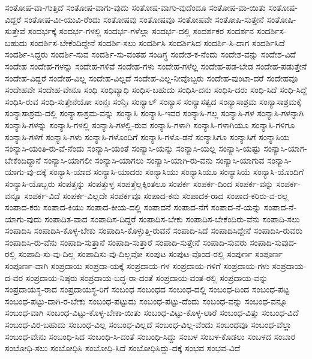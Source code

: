 {ಸಂತೋಷ-ವಾ-ಗುತ್ತಿದೆ
ಸಂತೋಷ-ವಾಗು-ವುದು
ಸಂತೋಷ-ವಾಗು-ವುದೆಂದೂ
ಸಂತೋಷ-ವಾ-ಯಿತು
ಸಂತೋಷ-ವಿದ್ದರೆ
ಸಂತೋಷ-ವೀ-ಯುವಿ-ರೆಂದು
ಸಂತೋಷವು
ಸಂತೋಷವೂ
ಸಂತೋಷವೇ
ಸಂತೋಷಿ-ಸುತ್ತೇನೆ
ಸಂತೋಷಿ-ಸುತ್ತೇವೆ
ಸಂದರ್ಭಕ್ಕೆ
ಸಂದರ್ಭ-ಗಳಲ್ಲಿ
ಸಂದರ್ಭ-ಗಳೆಲ್ಲಾ
ಸಂದರ್ಭ-ದಲ್ಲಿ
ಸಂದರ್ಶಕರ
ಸಂದರ್ಶನ
ಸಂದರ್ಶಿಸ-ಬಹುದು
ಸಂದರ್ಶಿಸ-ಬೇಕೆಂದಿದ್ದೇನೆ
ಸಂದರ್ಶಿ-ಸಲು
ಸಂದರ್ಶಿಸಿ
ಸಂದರ್ಶಿಸಿದ
ಸಂದರ್ಶಿ-ಸಿ-ದಾಗ
ಸಂದರ್ಶಿಸಿದೆ
ಸಂದರ್ಶಿ-ಸಿದ್ದರು
ಸಂದರ್ಶಿ-ಸುವ
ಸಂದರ್ಶಿ-ಸು-ವಂತಹ
ಸಂದಿಗ್ಧ
ಸಂದೇಶ-ಕ-ನೆಂದು
ಸಂದೇಶ-ವನ್ನು
ಸಂದೇಶ-ವಿದೆ
ಸಂದೇಹ
ಸಂದೇಹ-ಗಳನ್ನು
ಸಂದೇಹ-ಗಳಿವೆ
ಸಂದೇಹ-ಗಳು
ಸಂದೇಹ-ಗಳೆಲ್ಲ
ಸಂದೇಹ-ಪಡ-ಬೇಡ
ಸಂದೇಹ-ಪಡುತ್ತೇನೆ
ಸಂದೇಹ-ವಿದ್ದರೆ
ಸಂದೇಹ-ವಿಲ್ಲ
ಸಂದೇಹ-ವಿಲ್ಲದೆ
ಸಂದೇಹ-ವಿಲ್ಲ-ನೀವೊಬ್ಬರು
ಸಂದೇಹ-ವುಂಟಾ-ದರೆ
ಸಂದೇಹವೂ
ಸಂದೇಹವೇ
ಸಂದೇಹ-ವೇನೂ
ಸಂಧಿ
ಸಂಧಿವ್ಯಾಧಿ
ಸಂಧಿಸ-ಬಹುದು
ಸಂಧಿಸಿ-ದನು
ಸಂಧಿಸಿ-ದರು
ಸಂಧಿ-ಸಿದೆ
ಸಂಧಿ-ಸಿದ್ದೆ
ಸಂಧಿಸಿ-ರುವ
ಸಂಧಿ-ಸುತ್ತೇನೆಯೋ
ಸಂನ್ತಃ
ಸಂನ್ತಿಃ
ಸಂನ್ಯಾಲ್
ಸಂನ್ಯಾಸ
ಸಂನ್ಯಾಸತ್ವದ
ಸಂನ್ಯಾಸಾಶ್ರಮ
ಸಂನ್ಯಾಸಾಶ್ರಮಕ್ಕೆ
ಸಂನ್ಯಾಸಾಶ್ರಮ-ದಲ್ಲಿ
ಸಂನ್ಯಾಸಾಶ್ರಮ-ವನ್ನು
ಸಂನ್ಯಾಸಿ
ಸಂನ್ಯಾಸಿ-ಇವರ
ಸಂನ್ಯಾಸಿ-ಗಲ್ಲ
ಸಂನ್ಯಾಸಿ-ಗಳ
ಸಂನ್ಯಾಸಿ-ಗಳನ್ನಾಗಿ
ಸಂನ್ಯಾಸಿ-ಗಳನ್ನು
ಸಂನ್ಯಾಸಿ-ಗಳಲ್ಲಿ
ಸಂನ್ಯಾಸಿ-ಗಳಲ್ಲಿ-ರುವ
ಸಂನ್ಯಾಸಿ-ಗಳಾಗಿ
ಸಂನ್ಯಾಸಿ-ಗಳಾಗಿಯೂ
ಸಂನ್ಯಾಸಿ-ಗಳಿಗೂ
ಸಂನ್ಯಾಸಿ-ಗಳಿಗೆ
ಸಂನ್ಯಾಸಿ-ಗಳು
ಸಂನ್ಯಾಸಿ-ಗಳೊಂದಿಗೆ
ಸಂನ್ಯಾಸಿ-ಗಳೊ-ಡನೆ
ಸಂನ್ಯಾಸಿಗೂ
ಸಂನ್ಯಾಸಿಗೆ
ಸಂನ್ಯಾಸಿಯ
ಸಂನ್ಯಾಸಿ-ಯಂತಿ-ರು-ವೆ-ನೆಂದು
ಸಂನ್ಯಾಸಿ-ಯಂತೆ
ಸಂನ್ಯಾಸಿ-ಯನ್ನು
ಸಂನ್ಯಾಸಿ-ಯಲ್ಲ
ಸಂನ್ಯಾಸಿ-ಯಷ್ಟು
ಸಂನ್ಯಾಸಿ-ಯಾಗ-ಬೇಕೆಂದಿದ್ದಾನೆ
ಸಂನ್ಯಾಸಿ-ಯಾಗಲೀ
ಸಂನ್ಯಾಸಿ-ಯಾಗಲು
ಸಂನ್ಯಾಸಿ-ಯಾಗಿ-ರು-ವನು
ಸಂನ್ಯಾಸಿ-ಯಾಗುವ
ಸಂನ್ಯಾಸಿ-ಯಾಗು-ವು-ದಕ್ಕೆ
ಸಂನ್ಯಾಸಿ-ಯಾದ
ಸಂನ್ಯಾಸಿ-ಯಾದರು
ಸಂನ್ಯಾಸಿಯು
ಸಂನ್ಯಾಸಿಯೂ
ಸಂನ್ಯಾಸಿಯೆ
ಸಂನ್ಯಾಸಿ-ಯೊಂದಿಗೆ
ಸಂನ್ಯಾಸಿ-ಯೊಬ್ಬರು
ಸಂಪತ್ತನ್ನು
ಸಂಪತ್ತುಳ್ಳ
ಸಂಪತ್ತೆಲ್ಲಕ್ಕಿಂತಲೂ
ಸಂಪರ್ಕ
ಸಂಪರ್ಕ-ದಿಂದ
ಸಂಪರ್ಕ-ವನ್ನು
ಸಂಪರ್ಕ-ವನ್ನೂ
ಸಂಪರ್ಕ-ವಿದೆ
ಸಂಪರ್ಕ-ವಿಲ್ಲದೇ
ಸಂಪರ್ಕವೂ
ಸಂಪಾದ-ಕನು
ಸಂಪಾದಕ-ರಾದ
ಸಂಪಾದ-ಕರಿರು-ವ-ರಲ್ಲ
ಸಂಪಾದ-ಕರು
ಸಂಪಾದ-ಕಿಯು
ಸಂಪಾದ-ಕೀಯ-ದಲ್ಲಿ
ಸಂಪಾದನೆ
ಸಂಪಾದ-ನೆಗೆ
ಸಂಪಾದ-ನೆ-ಯನ್ನು
ಸಂಪಾದ-ನೆ-ಯಾಗು-ವುದು
ಸಂಪಾದಿತ-ವಾದ
ಸಂಪಾದಿಸ-ದಿದ್ದರೆ
ಸಂಪಾದಿಸ-ಬೇಕು
ಸಂಪಾದಿಸ-ಬೇಕೆಂದಿರು-ವೆನು
ಸಂಪಾದಿ-ಸಲು
ಸಂಪಾದಿಸಿ
ಸಂಪಾದಿಸಿ-ಕೊಳ್ಳ-ಬೇಕು
ಸಂಪಾದಿಸಿ-ಕೊಳ್ಳುತ್ತಿ-ರುವನೆ
ಸಂಪಾದಿ-ಸಿದೆ
ಸಂಪಾದಿಸಿದ್ದೇನೆ
ಸಂಪಾದಿಸಿ-ರುವರು
ಸಂಪಾದಿಸಿ-ರು-ವೆನು
ಸಂಪಾದಿ-ಸುತ್ತಾನೆ
ಸಂಪಾದಿ-ಸುತ್ತಾರೆ
ಸಂಪಾದಿ-ಸುತ್ತೇನೆ
ಸಂಪಾದಿ-ಸುವರು
ಸಂಪಾದಿ-ಸುವುದ-ರಲ್ಲಿ
ಸಂಪಾದಿ-ಸು-ವು-ದಿಲ್ಲ
ಸಂಪಾದಿಸು-ವು-ದಿಲ್ಲವೋ
ಸಂಪುಟ
ಸಂಪುಟ-ವೊಂದ-ರಲ್ಲಿ
ಸಂಪುರ್ಣ
ಸಂಪೂರ್ಣ
ಸಂಪೂರ್ಣ-ವಾಗಿ
ಸಂಪ್ರದಾಯ
ಸಂಪ್ರದಾ-ಯಕ್ಕೆ
ಸಂಪ್ರದಾಯ-ಗಳ
ಸಂಪ್ರದಾಯ-ಗಳಿಗೆ
ಸಂಪ್ರದಾಯ-ಗಳು
ಸಂಪ್ರದಾಯ-ದ-ವರ
ಸಂಪ್ರದಾಯ-ನಿಷ್ಠರು
ಸಂಪ್ರದಾಯ-ಬದ್ಧ-ರಾ-ದಂತೆ
ಸಂಪ್ರದಾಯ-ವಂತ-ರಲ್ಲಿ
ಸಂಪ್ರದಾಯ-ವನ್ನು
ಸಂಪ್ರದಾಯಸ್ಥ-ರಾದ
ಸಂಪ್ರದಾಯಸ್ಥ-ರಿಗೆ
ಸಂಬಂಧ
ಸಂಬಂಧದ
ಸಂಬಂಧ-ದಲ್ಲಿ
ಸಂಬಂಧ-ದಿಂದ
ಸಂಬಂಧ-ಪಟ್ಟ
ಸಂಬಂಧ-ಪಟ್ಟು-ದಾಗಿ-ರ-ಬೇಕು
ಸಂಬಂಧ-ಪಟ್ಟುದು
ಸಂಬಂಧ-ಪಟ್ಟು-ದೆಂದು
ಸಂಬಂಧ-ವನ್ನು
ಸಂಬಂಧ-ವನ್ನೂ
ಸಂಬಂಧ-ವಾಗಿ
ಸಂಬಂಧ-ವಿಟ್ಟು-ಕೊಳ್ಳ-ಬೇಕಾ-ಯಿತು
ಸಂಬಂಧ-ವಿಟ್ಟು-ಕೊಳ್ಳ-ಲಾರೆ
ಸಂಬಂಧ-ವಿತ್ತು
ಸಂಬಂಧ-ವಿದೆ
ಸಂಬಂಧ-ವಿರ-ಬಹುದು
ಸಂಬಂಧ-ವಿಲ್ಲ
ಸಂಬಂಧ-ವಿಲ್ಲದೆ
ಸಂಬಂಧ-ವಿಲ್ಲ-ವೆಂದು
ಸಂಬಂಧವೂ
ಸಂಬಂಧ-ವೆಲ್ಲಾ
ಸಂಬಂಧ-ವೇನು
ಸಂಬಂಧಿ-ಸಿದ
ಸಂಬಂಧಿ-ಸಿ-ದಂತೆ
ಸಂಬಂಧಿ-ಸಿದ್ದು
ಸಂಬಳ
ಸಂಬಳ-ಕೊಡಲು
ಸಂಬಳದ
ಸಂಬಾರ
ಸಂಬೋಧಿ-ಸಲು
ಸಂಬೋಧಿಸಿ
ಸಂಬೋಧಿ-ಸಿದೆ
ಸಂಬೋಧಿಸಿದ್ದು-ದಕ್ಕೆ
ಸಂಭವ
ಸಂಭವ-ವಿದೆ
}
